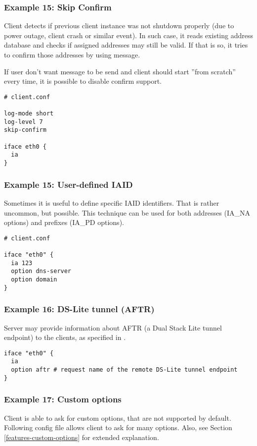 \subsubsection{Example 15: Skip Confirm}
\label{example-client-confirm}
Client detects if previous client instance was not shutdown properly
(due to power outage, client crash or similar event). In such case, it
reads existing address database and checks if assigned addresses may
still be valid. If that is so, it tries to confirm those addresses by
using  message.

If user don't want  message to be send and client should
start ''from scratch'' every time, it is possible to disable confirm
support.

\begin{lstlisting}
# client.conf

log-mode short
log-level 7
skip-confirm

iface eth0 {
  ia
}
\end{lstlisting}

\subsubsection{Example 15: User-defined IAID}
\label{example-client-iaid}
Sometimes it is useful to define specific IAID  identifiers. That is
rather uncommon, but possible. This technique can be used for both
addresses (IA\_NA options) and prefixes (IA\_PD options).

\begin{lstlisting}
# client.conf

iface "eth0" {
  ia 123
  option dns-server
  option domain
}
\end{lstlisting}

\subsubsection{Example 16: DS-Lite tunnel (AFTR)}
\label{example-server-ds-lite}
Server may provide information about AFTR (a Dual Stack Lite tunnel
endpoint) to the clients, as specified in \cite{rfc6334}.

\begin{lstlisting}
iface "eth0" {
  ia
  option aftr # request name of the remote DS-Lite tunnel endpoint
}
\end{lstlisting}

\subsubsection{Example 17: Custom options}
Client is able to ask for custom options, that are not supported by
default. Following config file allows client to ask for many
options. Also, see Section \ref{features-custom-options} for
extended explanation.

